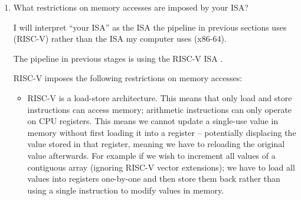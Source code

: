 \documentclass[10pt,\jkfside,a4paper]{article}
\begin{document}
\begin{enumerate}
\begin{itemize}
Multithreading allows the processor to execute code without any data
dependencies. For a single-issue processor\footnote{talking about data
dependency resolution in superscalars, VLIW or EPIC would be dramatic
overkill -- this would add synchronous multithreading} such as we are
talking about, there are two types of multithreading: fine-grained and
course-grained multithreading. In fine-grained multithreading, consecutive
instructions are issued by different threads -- if one stalls then the other
will issue on consecutive cycles until the memory access returns. The second
type of multithreading is coarse-grained multithreading; when the first
thread stalls the others will start issuing instructions. Implementing
either type of multithreading will require multiple sets of registers -- one
per thread.

The final ``solution'' is to context switch. If a process can truly execute
nothing for hundreds of thousands or millions of cycles, then yielding may
be more efficient. For example if a process with a single thread attempts to
read from memory a value which all subsequent instructions depend on and causes
a page fault then it may yield and allow another process to execute while
the memory access takes place. This decision should be based on an estimate
of how long until the memory access will return versus how long it will take
to context switch.

\end{itemize}

\item What restrictions on memory accesses are imposed by your ISA?


I will interpret ``your ISA'' as the ISA the pipeline in previous sections
uses (RISC-V) rather than the ISA my computer uses (x86-64).

The pipeline in previous stages is using the RISC-V ISA .

RISC-V imposes the following restrictions on memory accesses:

\begin{itemize}

\item RISC-V is a load-store architecture. This means that only load and
store instructions can access memory; arithmetic instructions can only operate
on CPU registers. This means we cannot update a single-use value in memory
without first loading it into a register -- potentially displacing the
value stored in that register, meaning we have to reloading the original value
afterwards. For example if we wish to increment all values of a
contiguous array (ignoring RISC-V vector extensions); we have to load all
values into registers one-by-one and then store them back rather than using
a single instruction to modify values in memory.


\end{itemize}
\end{enumerate}
\end{document}
